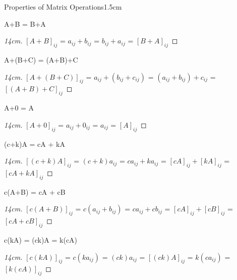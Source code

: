     \newpage



    \begin{ltheorem}{Properties of Matrix Operations}{1.5cm}
        \item A+B = B+A
        
            \begin{proof}[14cm]
                $[A+B]_{ij}$ = $a_{ij} + b_{ij}$
                = $b_{ij} + a_{ij}$ = $[B+A]_{ij}$
            \end{proof}
        
        \item A+(B+C) = (A+B)+C
        
            \begin{proof}[14cm]
                $[A+(B+C)]_{ij}$ = $a_{ij} + (b_{ij} + c_{ij})$
                = $(a_{ij} + b_{ij}) + c_{ij}$ = $[(A+B)+C]_{ij}$
            \end{proof}
        
        \item A+0 = A
        
            \begin{proof}[14cm]
                $[A+0]_{ij}$ = $a_{ij} + 0_{ij}$
                = $a_{ij}$ = $[A]_{ij}$
            \end{proof}
        
        \item (c+k)A = cA + kA
            
            \begin{proof}[14cm]
                $[(c+k)A]_{ij}$ = $(c+k)a_{ij}$
                = $ca_{ij} + ka_{ij}$ = $[cA]_{ij} + [kA]_{ij}$
                = $[cA + kA]_{ij}$
            \end{proof}
        
        \item c(A+B) = cA + cB
        
            \begin{proof}[14cm]
                $[c(A+B)]_{ij}$ = $c(a_{ij} + b_{ij})$
                = $ca_{ij} + cb_{ij}$ = $[cA]_{ij} + [cB]_{ij}$
                = $[cA+cB]_{ij}$
            \end{proof}

        \item c(kA) = (ck)A = k(cA)
        
            \begin{proof}[14cm]
                $[c(kA)]_{ij}$
                = $c(ka_{ij})$
                = $(ck)a_{ij}$
                = $[(ck)A]_{ij}$
                = $k(ca_{ij})$
                = $[k(cA)]_{ij}$
            \end{proof}
        

\end{ltheorem}
